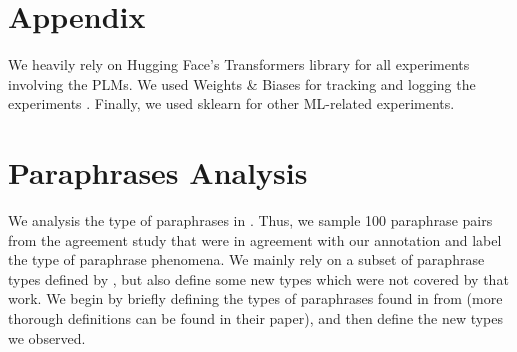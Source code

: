 \section{Appendix}
\label{sec:appendix}

We heavily rely on Hugging Face's Transformers library \cite{wolf-etal-2020-transformers} for all experiments involving the PLMs.
We used Weights \& Biases for tracking and logging the experiments \cite{wandb}.
Finally, we used sklearn \cite{scikit-learn} for other ML-related experiments.

% 

\section{Paraphrases Analysis}
\label{sec:paraphrase_analysis}

We analysis the type of paraphrases in \resource{}. Thus, we sample 100 paraphrase pairs from the agreement study that were in agreement with our annotation and label the type of paraphrase phenomena.
We mainly rely on a subset of paraphrase types defined by \citet{what_is_paraphrase}, but also define some new types which were not covered by that work.
We begin by briefly defining the types of paraphrases found in \resource{} from \citet{what_is_paraphrase} (more thorough definitions can be found in their paper), and then define the new types we observed.



